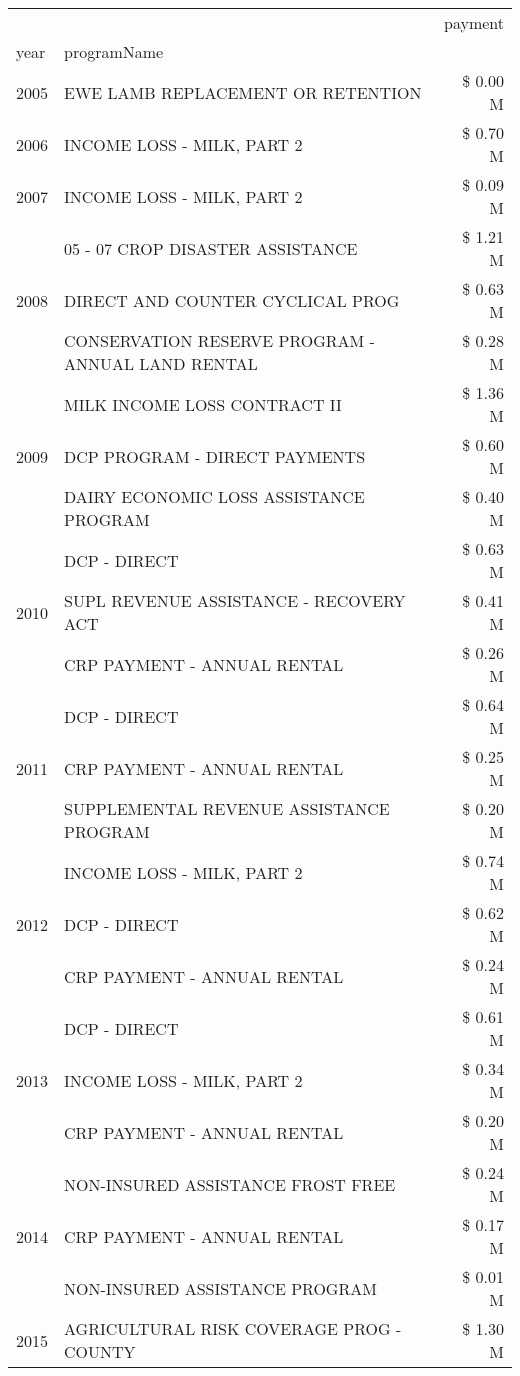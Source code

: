 \begin{tabular}{llr}
\toprule
 &  & payment \\
year & programName &  \\
\midrule
2005 & EWE LAMB REPLACEMENT OR RETENTION & \$ 0.00 M \\
\cline{1-3}
2006 & INCOME LOSS - MILK, PART 2 & \$ 0.70 M \\
\cline{1-3}
2007 & INCOME LOSS - MILK, PART 2 & \$ 0.09 M \\
\cline{1-3}
\multirow[t]{3}{*}{2008} & 05 - 07 CROP DISASTER ASSISTANCE & \$ 1.21 M \\
 & DIRECT AND COUNTER CYCLICAL PROG & \$ 0.63 M \\
 & CONSERVATION RESERVE PROGRAM - ANNUAL LAND RENTAL & \$ 0.28 M \\
\cline{1-3}
\multirow[t]{3}{*}{2009} & MILK INCOME LOSS CONTRACT II & \$ 1.36 M \\
 & DCP PROGRAM - DIRECT PAYMENTS & \$ 0.60 M \\
 & DAIRY ECONOMIC LOSS ASSISTANCE PROGRAM & \$ 0.40 M \\
\cline{1-3}
\multirow[t]{3}{*}{2010} & DCP - DIRECT & \$ 0.63 M \\
 & SUPL REVENUE ASSISTANCE - RECOVERY ACT & \$ 0.41 M \\
 & CRP PAYMENT - ANNUAL RENTAL & \$ 0.26 M \\
\cline{1-3}
\multirow[t]{3}{*}{2011} & DCP - DIRECT & \$ 0.64 M \\
 & CRP PAYMENT - ANNUAL RENTAL & \$ 0.25 M \\
 & SUPPLEMENTAL REVENUE ASSISTANCE PROGRAM & \$ 0.20 M \\
\cline{1-3}
\multirow[t]{3}{*}{2012} & INCOME LOSS - MILK, PART 2 & \$ 0.74 M \\
 & DCP - DIRECT & \$ 0.62 M \\
 & CRP PAYMENT - ANNUAL RENTAL & \$ 0.24 M \\
\cline{1-3}
\multirow[t]{3}{*}{2013} & DCP - DIRECT & \$ 0.61 M \\
 & INCOME LOSS - MILK, PART 2 & \$ 0.34 M \\
 & CRP PAYMENT - ANNUAL RENTAL & \$ 0.20 M \\
\cline{1-3}
\multirow[t]{3}{*}{2014} & NON-INSURED ASSISTANCE FROST FREE & \$ 0.24 M \\
 & CRP PAYMENT - ANNUAL RENTAL & \$ 0.17 M \\
 & NON-INSURED ASSISTANCE PROGRAM & \$ 0.01 M \\
\cline{1-3}
\multirow[t]{3}{*}{2015} & AGRICULTURAL RISK COVERAGE PROG - COUNTY & \$ 1.30 M \\

\end{tabular}
